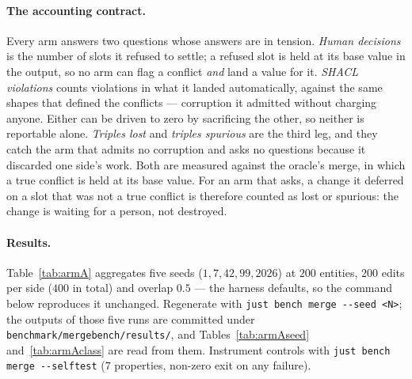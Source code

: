 \paragraph{The accounting contract.} Every arm answers two questions whose
answers are in tension. \emph{Human decisions} is the number of slots it refused
to settle; a refused slot is held at its base value in the output, so no arm can
flag a conflict \emph{and} land a value for it. \emph{SHACL violations} counts
violations in what it landed automatically, against the same shapes that defined
the conflicts --- corruption it admitted without charging anyone. Either can be
driven to zero by sacrificing the other, so neither is reportable alone.
\emph{Triples lost} and \emph{triples spurious} are the third leg, and they
catch the arm that admits no corruption and asks no questions because it
discarded one side's work. Both are measured against the oracle's merge, in
which a true conflict is held at its base value. For an arm that asks, a change
it deferred on a slot that was not a true conflict is therefore counted as lost
or spurious: the change is waiting for a person, not destroyed.

\paragraph{Results.} Table~\ref{tab:armA} aggregates five seeds
($1, 7, 42, 99, 2026$) at $200$ entities, $200$ edits per side ($400$ in total)
and overlap $0.5$ --- the harness defaults, so the command below reproduces it
unchanged. Regenerate with \texttt{just bench merge -{}-seed <N>}; the outputs of those five
runs are committed under \texttt{benchmark/mergebench/results/}, and
Tables~\ref{tab:armAseed} and~\ref{tab:armAclass} are read from them. Instrument controls
with \texttt{just bench merge -{}-selftest} ($7$ properties, non-zero exit on any
failure).

